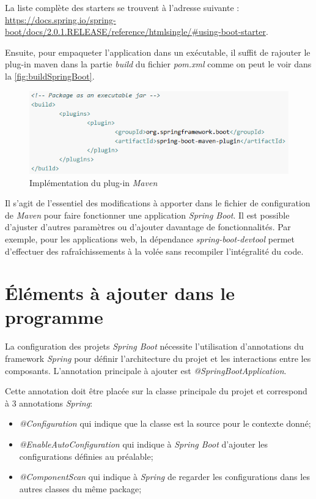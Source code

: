\documentclass{polytech/polytech}
\begin{document}
La liste complète des starters se trouvent à l’adresse suivante : \url{https://docs.spring.io/spring-boot/docs/2.0.1.RELEASE/reference/htmlsingle/#using-boot-starter}.

Ensuite, pour empaqueter l'application dans un exécutable, il suffit de rajouter le plug-in maven dans la partie \textit{build} du fichier \textit{pom.xml} comme on peut le voir dans la \autoref{fig:buildSpringBoot}.

\begin{figure}
	\includegraphics[scale=0.75]{images/buildSpringBoot}
	\caption{Implémentation du plug-in \textit{Maven}}
	\label{fig:buildSpringBoot}
\end{figure}

Il s’agit de l’essentiel des modifications à apporter dans le fichier de configuration de \textit{Maven} pour faire fonctionner une application \textit{Spring Boot}. Il est possible d’ajuster d’autres paramètres ou d’ajouter davantage de fonctionnalités. Par exemple, pour les applications web, la dépendance \textit{spring-boot-devtool} permet d’effectuer des rafraîchissements à la volée sans recompiler l’intégralité du code. 


\section{Éléments à ajouter dans le programme}
\label{sec:elementsSpringBoot}

La configuration des projets \textit{Spring Boot} nécessite l’utilisation d’annotations du framework \textit{Spring} pour définir l’architecture du projet et les interactions entre les composants. L’annotation principale à ajouter est \textit{@SpringBootApplication}.


Cette annotation doit être placée sur la classe principale du projet et correspond à 3 annotations \textit{Spring}:
\begin{itemize}
	\item \textit{@Configuration} qui indique que la classe est la source pour le contexte donné;
	\item \textit{@EnableAutoConfiguration} qui indique à \textit{Spring Boot} d’ajouter les configurations définies au préalable;
	\item \textit{@ComponentScan} qui indique à \textit{Spring} de regarder les configurations dans les autres classes du même package;
\end{itemize}
\end{document}

